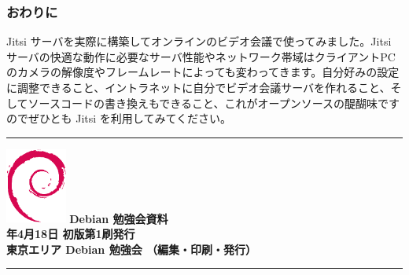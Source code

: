 \documentclass[mingoth,a4paper]{jsarticle}
\newcommand{\debmtgyear}{2020}
\newcommand{\debmtgmonth}{4}
\newcommand{\debmtgdate}{18}
\begin{document}
\subsubsection{おわりに}

Jitsi サーバを実際に構築してオンラインのビデオ会議で使ってみました。Jitsi サーバの快適な動作に必要なサーバ性能やネットワーク帯域はクライアントPCのカメラの解像度やフレームレートによっても変わってきます。自分好みの設定に調整できること、イントラネットに自分でビデオ会議サーバを作れること、そしてソースコードの書き換えもできること、これがオープンソースの醍醐味ですのでぜひとも Jitsi を利用してみてください。


\mbox{}\newpage

\vspace*{15cm}
\hrule
\vspace{2mm}
\includegraphics[width=2cm]{image200502/openlogo-nd.eps}
\noindent \Large \bf Debian 勉強会資料\\
\noindent \normalfont \debmtgyear{}年\debmtgmonth{}月\debmtgdate{}日 \hspace{5mm}  初版第1刷発行\\
\noindent \normalfont 東京エリア Debian 勉強会 （編集・印刷・発行）\\
\hrule
\end{document}
